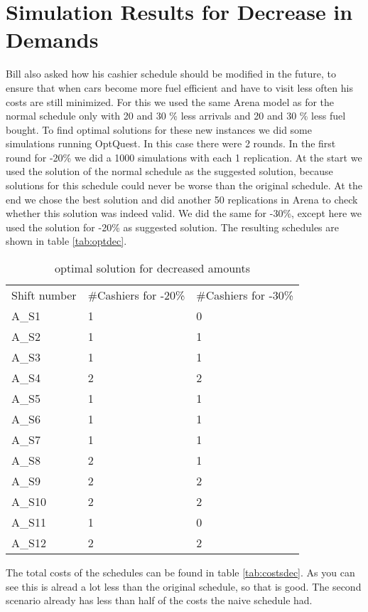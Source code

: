 \section{Simulation Results for Decrease in Demands}\label{app:demands}
Bill also asked how his cashier schedule should be modified in the future, to ensure that when cars become more fuel efficient and have to visit less often his costs are still minimized. 
For this we used the same Arena model as for the normal schedule only with 20 and 30 \% less arrivals and 20 and 30 \% less fuel bought. 
To find optimal solutions for these new instances we did some simulations running OptQuest. 
In this case there were 2 rounds.
In the first round for -20\% we did a 1000 simulations with each 1 replication. 
At the start we used the solution of the normal schedule as the suggested solution, because solutions for this schedule could never be worse than the original schedule.
At the end we chose the best solution and did another 50 replications in Arena to check whether this solution was indeed valid. 
We did the same for -30\%, except here we used the solution for -20\% as suggested solution.
The resulting schedules are shown in table \autoref{tab:optdec}.

\begin{table}[h!]
	\centering
	\begin{tabular}{l | l | l }
		Shift number & \#Cashiers for -20\% & \#Cashiers for -30\% \\
		A\_S1 & 1 & 0\\
		A\_S2 & 1 & 1\\
		A\_S3 & 1 & 1\\
		A\_S4 & 2 & 2\\
		A\_S5 & 1 & 1\\
		A\_S6 & 1 & 1\\
		A\_S7 & 1 & 1\\
		A\_S8 & 2 & 1\\
		A\_S9 & 2 & 2\\
		A\_S10 & 2 & 2\\
		A\_S11 & 1 & 0\\
		A\_S12 & 2 & 2\\
	\end{tabular}
	\caption{optimal solution for decreased amounts}
	\label{tab:optdec}
\end{table}

The total costs of the schedules can be found in table \autoref{tab:costsdec}. As you can see this is alread a lot less than the original schedule, so that is good. The second scenario already has less than half of the costs the naive schedule had.

